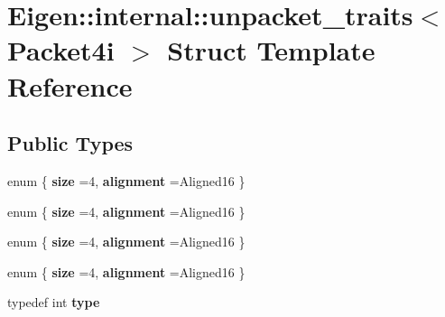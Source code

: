 \hypertarget{struct_eigen_1_1internal_1_1unpacket__traits_3_01_packet4i_01_4}{}\section{Eigen\+::internal\+::unpacket\+\_\+traits$<$ Packet4i $>$ Struct Template Reference}
\label{struct_eigen_1_1internal_1_1unpacket__traits_3_01_packet4i_01_4}
\subsection*{Public Types}
\begin{DoxyCompactItemize}
\item 
\mbox{\label{struct_eigen_1_1internal_1_1unpacket__traits_3_01_packet4i_01_4_aa5a29088588a1f5aad3ae5b753a40d9a}} 
enum \{ {\bfseries size} =4, 
{\bfseries alignment} =Aligned16
 \}
\item 
\mbox{\label{struct_eigen_1_1internal_1_1unpacket__traits_3_01_packet4i_01_4_a9997001207d2115245da08b74fd4de3c}} 
enum \{ {\bfseries size} =4, 
{\bfseries alignment} =Aligned16
 \}
\item 
\mbox{\label{struct_eigen_1_1internal_1_1unpacket__traits_3_01_packet4i_01_4_a151ca6fba0c85b24c8f1145fdde8289e}} 
enum \{ {\bfseries size} =4, 
{\bfseries alignment} =Aligned16
 \}
\item 
\mbox{\label{struct_eigen_1_1internal_1_1unpacket__traits_3_01_packet4i_01_4_ab578f4c566760043b8208f8ca6d25802}} 
enum \{ {\bfseries size} =4, 
{\bfseries alignment} =Aligned16
 \}
\item 
\mbox{\label{struct_eigen_1_1internal_1_1unpacket__traits_3_01_packet4i_01_4_a1b7d1b039b266cdfbd6dc2fa4e811812}} 
typedef int {\bfseries type}
\item 
\mbox{\label{struct_eigen_1_1internal_1_1unpacket__traits_3_01_packet4i_01_4_a75c567a3a2ec863be391967a237130df}} 

\end{DoxyCompactItemize}
